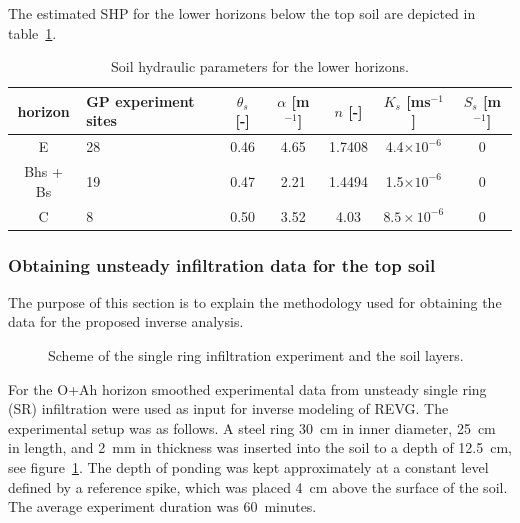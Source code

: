 \documentclass[review]{elsarticle}
\begin{document}
 



The estimated SHP for the lower horizons below the top soil are depicted in table~\ref{tab_SHP}.

\begin{table}[ht]
\begin{center}
\caption{Soil hydraulic parameters for the lower horizons.}
\begin{small}
\doublespacing
\begin{tabular}{c | p{2cm}| c c c c c}
\toprule
horizon &  GP experiment sites  & $\theta_s$ [-] & $\alpha$ [m$^{-1}$]& $n$ [-]& $K_s$ [ms$^{-1}$] & $S_s$ [m$^{-1}$] \\ \hline
E & 28 &  0.46&4.65&1.7408&4.4$\times 10^{-6}$ & 0\\
Bhs + Bs & 19  &0.47&2.21&1.4494&1.5$\times 10^{-6}$ & 0\\
C & 8 & 0.50 & 3.52 & 4.03 &  $8.5\times 10^{-6}$ & 0 \\
\toprule
\end{tabular}
\end{small}
\label{tab_SHP}
\end{center}
\end{table}


\subsubsection{Obtaining unsteady infiltration data for the top soil}
\label{krivka}

The purpose of this section is to explain the methodology used for obtaining the data for the proposed inverse analysis. 


 \begin{figure}
\centering
{}
 \caption{Scheme of the single ring infiltration experiment and the soil layers. }
 \label{experiment}
\end{figure}


For the O+Ah horizon smoothed experimental data from unsteady single ring (SR) infiltration were used as input for inverse modeling of REVG.
The experimental setup was as follows. A steel ring 30~cm in inner diameter, 25~cm in length, and 2~mm in thickness was inserted into the soil to a depth of 12.5~cm, see figure~\ref{experiment}. The depth of ponding was kept approximately at a constant level defined by a reference spike, which was placed 4~cm above the surface of the soil. The average experiment duration was 60~minutes.
\end{document}
